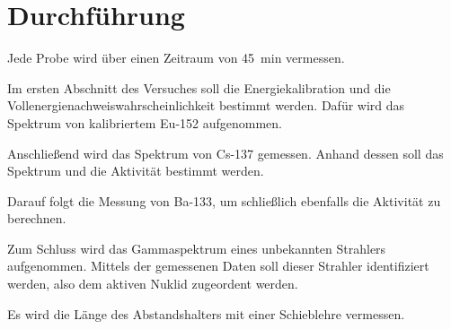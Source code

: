 \section{Durchführung}
\label{sec:durchführung}

Jede Probe wird über einen Zeitraum von \qty{45}{\minute} vermessen.

Im ersten Abschnitt des Versuches soll die Energiekalibration und die Vollenergienachweiswahrscheinlichkeit
bestimmt werden. Dafür wird das Spektrum von kalibriertem Eu-152 aufgenommen.

Anschließend wird das Spektrum von Cs-137 gemessen. Anhand dessen soll das Spektrum und die Aktivität bestimmt werden.

Darauf folgt die Messung von Ba-133, um schließlich ebenfalls die Aktivität zu berechnen.

Zum Schluss wird das Gammaspektrum eines unbekannten Strahlers aufgenommen.
Mittels der gemessenen Daten soll dieser Strahler identifiziert werden, also dem aktiven 
Nuklid zugeordent werden.

Es wird die Länge des Abstandshalters mit einer Schieblehre vermessen.